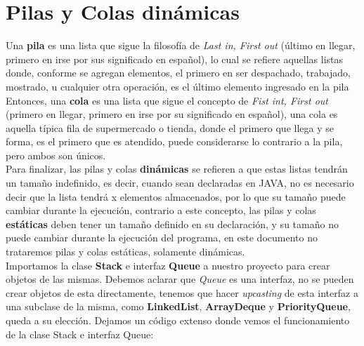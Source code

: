 \section{Pilas y Colas dinámicas}
Una \textbf{pila} es una lista que sigue la filosofía de \textit{Last in, First out} (último en llegar, primero en irse por sus significado en español), lo cual se refiere aquellas listas donde, conforme se agregan elementos, el primero en ser despachado, trabajado, mostrado, u cualquier otra operación, es el último elemento ingresado en la pila\\
Entonces, una \textbf{cola} es una lista que sigue el concepto de \textit{Fist int, First out} (primero en llegar, primero en irse por su significado en español), una cola es aquella típica fila de supermercado o tienda, donde el primero que llega y se forma, es el primero que es atendido, puede considerarse lo contrario a la pila, pero ambos son únicos.\\
Para finalizar, las pilas y colas \textbf{dinámicas} se refieren a que estas listas tendrán un tamaño indefinido, es decir, cuando sean declaradas en JAVA, no es necesario decir que la lista tendrá x elementos almacenados, por lo que su tamaño puede cambiar durante la ejecución, contrario a este concepto, las pilas y colas \textbf{estáticas} deben tener un tamaño definido en su declaración, y su tamaño no puede cambiar durante la ejecución del programa, en este documento no trataremos pilas y colas estáticas, solamente dinámicas.\\
Importamos la clase \textbf{Stack} e interfaz \textbf{Queue} a nuestro proyecto para crear objetos de las mismas. Debemos aclarar que \textit{Queue} es una interfaz, no se pueden crear objetos de esta directamente, tenemos que hacer \textit{upcasting} de esta interfaz a una subclase de la misma, como \textbf{LinkedList}, \textbf{ArrayDeque} y \textbf{PriorityQueue}, queda a su elección. Dejamos un código extenso donde vemos el funcionamiento de la clase Stack e interfaz Queue:
